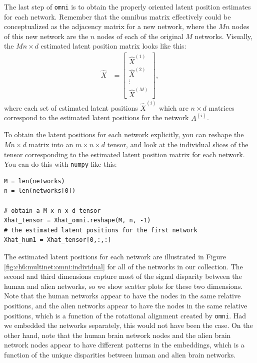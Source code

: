 The last step of \texttt{omni} is to obtain the properly oriented latent position estimates for each network. Remember that the omnibus matrix effectively could be conceptualized as the adjacency matrix for a new network, where the $Mn$ nodes of this new network are the $n$ nodes of each of the original $M$ networks. Visually, the $Mn \times d$ estimated latent position matrix looks like this:
\begin{align*}
    \hat X &= \begin{bmatrix}
        \hat X^{(1)} \\
        \hat X^{(2)} \\
        \vdots \\
        \hat X^{(M)}
    \end{bmatrix},
\end{align*}
where each set of estimated latent positions $\hat X^{(i)}$ which are $n \times d$ matrices correspond to the estimated latent positions for the network $A^{(i)}$.

To obtain the latent positions for each network explicitly, you can reshape the $Mn \times d$ matrix into an $m \times n \times d$ tensor, and look at the individual slices of the tensor corresponding to the estimated latent position matrix for each network. You can do this with \texttt{numpy} like this:

\begin{lstlisting}[style=python]
M = len(networks)
n = len(networks[0])

# obtain a M x n x d tensor
Xhat_tensor = Xhat_omni.reshape(M, n, -1)
# the estimated latent positions for the first network
Xhat_hum1 = Xhat_tensor[0,:,:]
\end{lstlisting}

The estimated latent positions for each network are illustrated in Figure \ref{fig:ch6:multinet:omni:individual} for all of the networks in our collection. The second and third dimensions capture most of the signal disparity between the human and alien networks, so we show scatter plots for these two dimensions. Note that the human networks appear to have the nodes in the same relative positions, and the alien networks appear to have the nodes in the same relative positions, which is a function of the rotational alignment created by \texttt{omni}. Had we embedded the networks separately, this would not have been the case. On the other hand, note that the human brain network nodes and the alien brain network nodes appear to have different patterns in the embeddings, which is a function of the unique disparities between human and alien brain networks.

